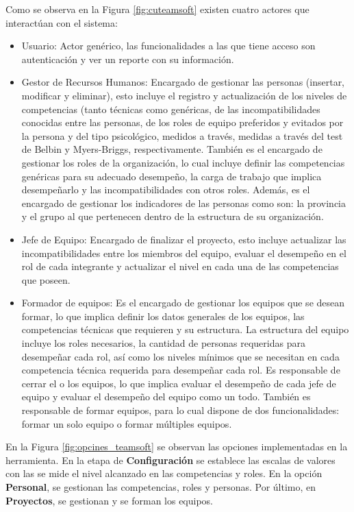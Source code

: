 Como se observa en la Figura \ref{fig:cuteamsoft} existen cuatro actores que interactúan con el sistema:
\begin{itemize}
	\item Usuario: Actor genérico, las funcionalidades a las que tiene acceso son autenticación y ver un reporte con su información.
	
	\item Gestor de Recursos Humanos: Encargado de gestionar las personas (insertar, modificar y eliminar), esto incluye el registro y actualización de los niveles de competencias (tanto técnicas como genéricas, de las incompatibilidades conocidas entre las personas, de los roles de equipo preferidos y evitados por la persona  y del tipo psicológico, medidos a través, medidas a través del test de Belbin y Myers-Briggs, respectivamente. También es el encargado de gestionar los roles de la organización, lo cual incluye definir las competencias genéricas para su adecuado desempeño, la carga de trabajo que implica desempeñarlo y las incompatibilidades con otros roles. Además, es el encargado de gestionar los indicadores de las personas como son: la provincia y el grupo al que pertenecen dentro de la estructura de su organización.
	
	\item Jefe de Equipo: Encargado de finalizar el proyecto, esto incluye actualizar las incompatibilidades entre los miembros del equipo, evaluar el desempeño en el rol de cada integrante y actualizar el nivel en cada una de las competencias que poseen.
	
	\item Formador de equipos: Es el encargado de gestionar los equipos que se desean formar, lo que implica definir los datos generales de los equipos, las competencias técnicas que requieren y su estructura. La estructura del equipo incluye los roles necesarios, la cantidad de personas requeridas para desempeñar cada rol, así como los niveles mínimos que se necesitan en cada competencia técnica requerida para desempeñar cada rol. Es responsable de cerrar el o los equipos, lo que implica evaluar el desempeño de cada jefe de equipo y evaluar el desempeño del equipo como un todo. También es responsable de formar equipos, para lo cual dispone de dos funcionalidades: formar un solo equipo o formar múltiples equipos.\\
\end{itemize}

En la Figura \ref{fig:opcines_teamsoft} se observan las opciones implementadas en la herramienta. En la etapa de \textbf{Configuración} se establece las escalas de valores con las se mide el nivel alcanzado en las competencias y roles. En la opción \textbf{Personal}, se gestionan las competencias, roles y personas. Por último, en \textbf{Proyectos}, se gestionan y se forman los equipos.\\

